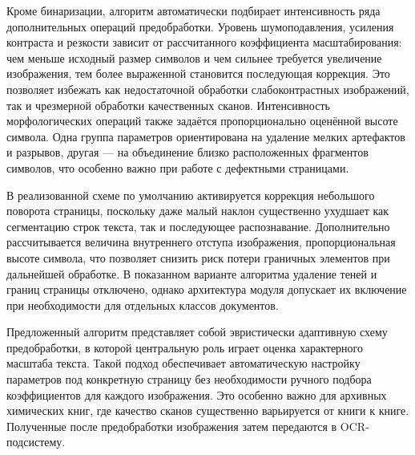 Кроме бинаризации, алгоритм автоматически подбирает интенсивность ряда дополнительных операций предобработки. Уровень шумоподавления, усиления контраста и резкости зависит от рассчитанного коэффициента масштабирования: чем меньше исходный размер символов и чем сильнее требуется увеличение изображения, тем более выраженной становится последующая коррекция. Это позволяет избежать как недостаточной обработки слабоконтрастных изображений, так и чрезмерной обработки качественных сканов. Интенсивность морфологических операций также задаётся пропорционально оценённой высоте символа. Одна группа параметров ориентирована на удаление мелких артефактов и разрывов, другая --- на объединение близко расположенных фрагментов символов, что особенно важно при работе с дефектными страницами.

В реализованной схеме по умолчанию активируется коррекция небольшого поворота страницы, поскольку даже малый наклон существенно ухудшает как сегментацию строк текста, так и последующее распознавание. Дополнительно рассчитывается величина внутреннего отступа изображения, пропорциональная высоте символа, что позволяет снизить риск потери граничных элементов при дальнейшей обработке. В показанном варианте алгоритма удаление теней и границ страницы отключено, однако архитектура модуля допускает их включение при необходимости для отдельных классов документов.

Предложенный алгоритм представляет собой эвристически адаптивную схему предобработки, в которой центральную роль играет оценка характерного масштаба текста. Такой подход обеспечивает автоматическую настройку параметров под конкретную страницу без необходимости ручного подбора коэффициентов для каждого изображения. Это особенно важно для архивных химических книг, где качество сканов существенно варьируется от книги к книге. Полученные после предобработки изображения затем передаются в OCR-подсистему.